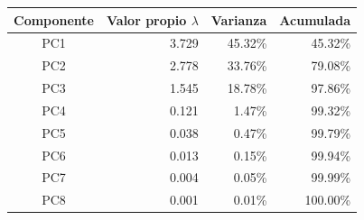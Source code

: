 \small
\begin{tabular}{crrr}
\toprule
Componente & Valor propio $\lambda$ & Varianza & Acumulada \\
\midrule
PC1 & 3.729 & 45.32\% & 45.32\% \\
PC2 & 2.778 & 33.76\% & 79.08\% \\
PC3 & 1.545 & 18.78\% & 97.86\% \\
PC4 & 0.121 & 1.47\% & 99.32\% \\
PC5 & 0.038 & 0.47\% & 99.79\% \\
PC6 & 0.013 & 0.15\% & 99.94\% \\
PC7 & 0.004 & 0.05\% & 99.99\% \\
PC8 & 0.001 & 0.01\% & 100.00\% \\
\bottomrule
\end{tabular}
